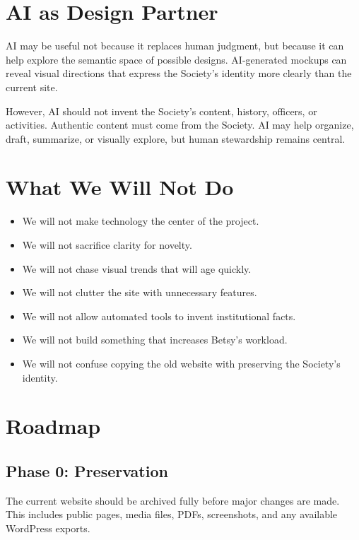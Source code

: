 \documentclass[11pt]{article}
\begin{document}
\section{AI as Design Partner}

AI may be useful not because it replaces human judgment, but because it can help explore the semantic space of possible designs. AI-generated mockups can reveal visual directions that express the Society's identity more clearly than the current site.

However, AI should not invent the Society's content, history, officers, or activities. Authentic content must come from the Society. AI may help organize, draft, summarize, or visually explore, but human stewardship remains central.

\section{What We Will Not Do}

\begin{itemize}[leftmargin=2em]
    \item We will not make technology the center of the project.
    \item We will not sacrifice clarity for novelty.
    \item We will not chase visual trends that will age quickly.
    \item We will not clutter the site with unnecessary features.
    \item We will not allow automated tools to invent institutional facts.
    \item We will not build something that increases Betsy's workload.
    \item We will not confuse copying the old website with preserving the Society's identity.
\end{itemize}

\section{Roadmap}

\subsection{Phase 0: Preservation}

The current website should be archived fully before major changes are made. This includes public pages, media files, PDFs, screenshots, and any available WordPress exports.
\end{document}
